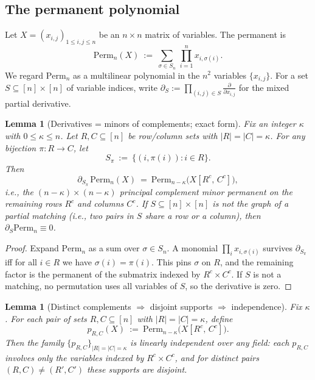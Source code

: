 \documentclass[12pt]{article}
\newtheorem{lemma}[theorem]{Lemma}
\theoremstyle{definition}
\theoremstyle{definition}
\theoremstyle{remark}
\theoremstyle{remark}
\begin{document}
\subsection{The permanent polynomial}

Let $X=(x_{i,j})_{1\le i,j\le n}$ be an $n\times n$ matrix of variables. The permanent is
\[
\mathrm{Perm}_n(X)\ :=\ \sum_{\sigma\in S_n}\,\prod_{i=1}^n x_{i,\sigma(i)}.
\]
We regard $\mathrm{Perm}_n$ as a multilinear polynomial in the $n^2$ variables $\{x_{i,j}\}$.
For a set $S\subseteq [n]\times[n]$ of variable indices, write $\partial_S:=\prod_{(i,j)\in S}\frac{\partial}{\partial x_{i,j}}$ for the mixed partial derivative.

\begin{lemma}[Derivatives = minors of complements; exact form]\label{lem:perm-derivatives}
Fix an integer $\kappa$ with $0\le \kappa\le n$. Let $R,C\subseteq[n]$ be row/column sets with $|R|=|C|=\kappa$. For any bijection $\pi: R\to C$, let
\[
S_\pi\ :=\ \{(i,\pi(i)): i\in R\}.
\]
Then
\[
\partial_{S_\pi}\, \mathrm{Perm}_n(X)\ =\ \mathrm{Perm}_{n-\kappa}\bigl(X[R^c,\,C^c]\bigr),
\]
i.e., the $(n-\kappa)\times(n-\kappa)$ principal complement minor permanent on the remaining rows $R^c$ and columns $C^c$.
If $S\subseteq[n]\times[n]$ is not the graph of a partial matching (i.e., two pairs in $S$ share a row or a column), then $\partial_S\mathrm{Perm}_n\equiv 0$.
\end{lemma}

\begin{proof}
Expand $\mathrm{Perm}_n$ as a sum over $\sigma\in S_n$. A monomial $\prod_i x_{i,\sigma(i)}$ survives $\partial_{S_\pi}$ iff for all $i\in R$ we have $\sigma(i)=\pi(i)$. This pins $\sigma$ on $R$, and the remaining factor is the permanent of the submatrix indexed by $R^c\times C^c$. If $S$ is not a matching, no permutation uses all variables of $S$, so the derivative is zero.
\end{proof}

\begin{lemma}[Distinct complements $\Rightarrow$ disjoint supports $\Rightarrow$ independence]\label{lem:perm-independence}
Fix $\kappa$. For each pair of sets $R,C\subseteq[n]$ with $|R|=|C|=\kappa$, define
\[
p_{R,C}(X)\ :=\ \mathrm{Perm}_{n-\kappa}\bigl(X[R^c,\,C^c]\bigr).
\]
Then the family $\{p_{R,C}\}_{|R|=|C|=\kappa}$ is linearly independent over any field: each $p_{R,C}$ involves only the variables indexed by $R^c\times C^c$, and for distinct pairs $(R,C)\neq(R',C')$ these supports are disjoint.
\end{lemma}
\end{document}
